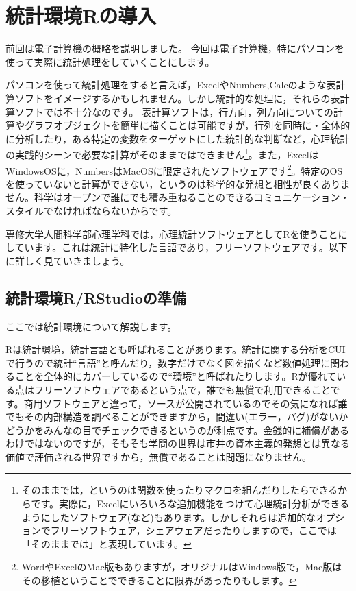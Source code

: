 \documentclass{ltjsbook}
\begin{document}
\VerbatimFootnotes
\chapter{統計環境Rの導入}
\label{03_useR}
前回は電子計算機の概略を説明しました。
今回は電子計算機，特にパソコンを使って実際に統計処理をしていくことにします。

パソコンを使って統計処理をすると言えば，ExcelやNumbers,Calcのような表計算ソフトをイメージするかもしれません。しかし統計的な処理に，それらの表計算ソフトでは不十分なのです。
表計算ソフトは，行方向，列方向についての計算やグラフオブジェクトを簡単に描くことは可能ですが，行列を同時に・全体的に分析したり，ある特定の変数をターゲットにした統計的な判断など，心理統計の実践的シーンで必要な計算がそのままではできません\footnote{そのままでは，というのは関数を使ったりマクロを組んだりしたらできるからです。実際に，Excelにいろいろな追加機能をつけて心理統計分析ができるようにしたソフトウェア(\parencite{HAD}など)もあります。しかしそれらは追加的なオプションでフリーソフトウェア，シェアウェアだったりしますので，ここでは「そのままでは」と表現しています。}。また，ExcelはWindowsOSに，NumbersはMacOSに限定されたソフトウェアです\footnote{WordやExcelのMac版もありますが，オリジナルはWindows版で，Mac版はその移植ということでできることに限界があったりもします。}。特定のOSを使っていないと計算ができない，というのは科学的な発想と相性が良くありません。科学はオープンで誰にでも積み重ねることのできるコミュニケーション・スタイルでなければならないからです。

専修大学人間科学部心理学科では，心理統計ソフトウェアとしてRを使うことにしています。これは統計に特化した言語であり，フリーソフトウェアです。以下に詳しく見ていきましょう。

\section{統計環境R/RStudioの準備}
ここでは統計環境について解説します。

Rは統計環境，統計言語とも呼ばれることがあります。統計に関する分析をCUIで行うので統計``言語''と呼んだり，数字だけでなく図を描くなど数値処理に関わることを全体的にカバーしているので``環境''と呼ばれたりします。Rが優れている点はフリーソフトウェアであるという点で，誰でも無償で利用できることです。商用ソフトウェアと違って，ソースが公開されているのでその気になれば誰でもその内部構造を調べることができますから，間違い(エラー，バグ)がないかどうかをみんなの目でチェックできるというのが利点です。金銭的に補償があるわけではないのですが，そもそも学問の世界は市井の資本主義的発想とは異なる価値で評価される世界ですから，無償であることは問題になりません。
\end{document}
